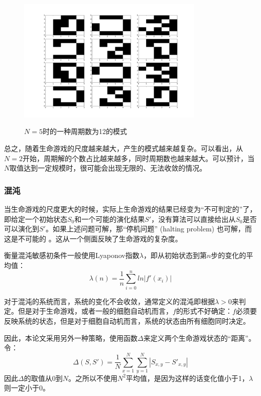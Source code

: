 \documentclass[a4paper,12pt]{article}
\begin{document}
\begin{figure}[!ht]
\centering
\includegraphics[width=0.8\textwidth]{images/img512.png}
\label{fig:n5}
\caption{$N=5$时的一种周期数为12的模式}
\end{figure}

总之，随着生命游戏的尺度越来越大，产生的模式越来越复杂。可以看出，从$N=2$开始，周期解的个数占比越来越多，同时周期数也越来越大。可以预计，当$N$取值达到一定规模时，很可能会出现无限的、无法收敛的情况。

\subsubsection{混沌}

当生命游戏的尺度更大的时候，实际上生命游戏的结果已经变为“不可判定的”了，即给定一个初始状态$S_0$和一个可能的演化结果$S'$，没有算法可以直接给出从$S_0$是否可以演化到$S'$。如果上述问题可解，那“停机问题” (halting problem) 也可解，而这是不可能的
\supercite{berlekamp2004winning}。这从一个侧面反映了生命游戏的复杂度。

衡量混沌敏感初条件一般使用Lyaponov指数$\lambda$，即从初始状态到第$n$步的变化的平均值：
\begin{equation}
\lambda(n) = \frac{1}{n}\sum_{i = 0}^{n} ln|f'(x_i)|
\end{equation}

对于混沌的系统而言，系统的变化不会收敛，通常定义的混沌即根据$\lambda > 0$来判定。但是对于生命游戏，或者一般的细胞自动机而言，$f$的形式不好确定：$f$必须要反映系统的状态，但是对于细胞自动机而言，系统的状态由所有细胞同时决定。

因此，本论文采用另外一种策略，使用函数$\Delta$来定义两个生命游戏状态的“距离”。令：
\begin{equation}
\Delta(S,S') = \frac{1}{N} \sum_{x=1}^{N}\sum_{y=1}^{N} |S_{x,y}-S'_{x,y}|
\end{equation}
因此$\Delta$的取值从0到$N$。之所以不使用$N^2$平均值，是因为这样的话变化值小于1，$\lambda$则一定小于0。
\end{document}
